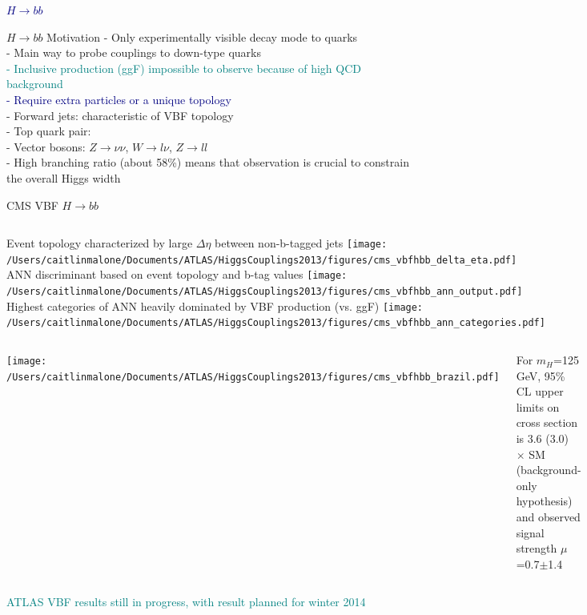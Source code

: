 \documentclass{beamer}
\begin{document}
\begin{frame}[c]
	\begin{center}
	\huge \textcolor{Navy}{$H\rightarrow bb$}
	\end{center}
\end{frame}



\begin{frame}{$H\rightarrow bb$ Motivation}
		\textcolor{BrickRed}{- Only experimentally visible decay mode to quarks}\\
		- Main way to probe couplings to down-type quarks \\
		\textcolor{Teal}{- Inclusive production (ggF) impossible to observe because of high QCD background}\\
		\textcolor{Navy}{- Require extra particles or a unique topology}\\
		\vspace{0.2cm}
			\scriptsize{
			\hspace{1cm}	- Forward jets: characteristic of VBF topology\\
			\hspace{1cm}	- Top quark pair: \\
			\hspace{1cm}	- Vector bosons: $Z\rightarrow\nu\nu$, $W\rightarrow l\nu$, $Z\rightarrow ll$\\
			}
		\vspace{0.2cm}
		\normalsize
		\textcolor{BrickRed}{- High branching ratio (about 58\%) means that observation is crucial to constrain the overall Higgs width}

\end{frame}


\begin{frame}{CMS VBF $H\rightarrow bb$}	
	\begin{columns}[c]
			\scriptsize Event topology characterized by large $\Delta\eta$ between non-b-tagged jets	
			\texttt{[image: /Users/caitlinmalone/Documents/ATLAS/HiggsCouplings2013/figures/cms\_vbfhbb\_delta\_eta.pdf]}
			\scriptsize ANN discriminant based on event topology and b-tag values
			\texttt{[image: /Users/caitlinmalone/Documents/ATLAS/HiggsCouplings2013/figures/cms\_vbfhbb\_ann\_output.pdf]}
			\scriptsize Highest categories of ANN heavily dominated by VBF production (vs. ggF)
			\texttt{[image: /Users/caitlinmalone/Documents/ATLAS/HiggsCouplings2013/figures/cms\_vbfhbb\_ann\_categories.pdf]}
	\end{columns}
	\begin{columns}[c]
			\texttt{[image: /Users/caitlinmalone/Documents/ATLAS/HiggsCouplings2013/figures/cms\_vbfhbb\_brazil.pdf]}
		\scriptsize 

		For $m_H$=125 GeV, 95\% CL upper limits on cross section is 3.6 (3.0) $\times$ SM (background-only hypothesis) and observed signal strength $\mu$=0.7$\pm$1.4
	\end{columns}
	\scriptsize\textcolor{Teal}{ATLAS VBF results still in progress, with result planned for winter 2014}
\end{frame}
\end{document}
